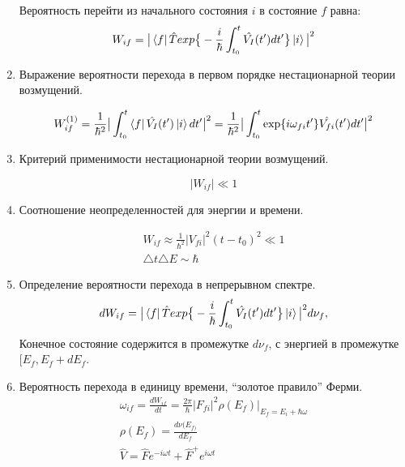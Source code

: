 \documentclass{article}
\begin{document}
\begin{enumerate}
	Вероятность перейти из начального состояния $i$ в состояние $f$ равна:
	\begin{equation}
		W_{if}=\big|\bra{f}\hat{T}exp\big\{-\frac{i}{\hbar}\int_{t_{0}}^{t}\hat{V_{I}}(t')dt'\big\}\ket{i}\big|^{2}
	\end{equation}
	
	\item {Выражение вероятности перехода в первом порядке нестационарной теории возмущений.}
	
	\begin{equation}
		W_{if}^{(1)}=\frac{1}{\hbar^{2}}\big|\int_{t_{0}}^{t}\bra{f}\hat{V_{I}}(t')\ket{i}dt'\big|^{2}=\frac{1}{\hbar^{2}}\big|\int_{t_{0}}^{t}\exp\{i\omega_{fi}t'\}\hat{V_{fi}}(t')dt'\big|^{2}
	\end{equation}
	
	\item {Критерий применимости нестационарной теории возмущений.}
	
	\begin{equation}
		|W_{if}|\ll1
	\end{equation}
	
	\item {Соотношение неопределенностей для энергии и времени.}
	
	\begin{gather}
		W_{if}\approx\frac{1}{\hbar^{2}}|V_{fi}|^{2}(t-t_{0})^{2}\ll1 \\
		\triangle t\triangle E\sim\hbar
	\end{gather}
	
	\item {Определение вероятности перехода в непрерывном спектре.}
	\begin{equation}
		dW_{if}=\big|\bra{f}\hat{T}exp\big\{-\frac{i}{\hbar}\int_{t_{0}}^{t}\hat{V_{I}}(t')dt'\big\}\ket{i}\big|^{2}d\nu_{f},
	\end{equation}
	Конечное состояние содержится в промежутке $d\nu_f$, с энергией в промежутке $[E_f, E_f + dE_f$.
	
	\item {Вероятность перехода в единицу времени, “золотое правило” Ферми.}
	\begin{gather}
		\omega_{if}=\frac{dW_{if}}{dt}=\frac{2\pi}{\hbar}\big|F_{fi}\big|^{2}\rho(E_{f})\big|_{E_{f}=E_{i}+\hbar\omega} \\
		\rho(E_{f})=\frac{d\nu(E_{f)}}{dE_{f}} \\
		\hat{V}=\hat{F}e^{-i\omega t}+\hat{F}^{+}e^{i\omega t}
	\end{gather}
	

\end{enumerate}
\end{document}
